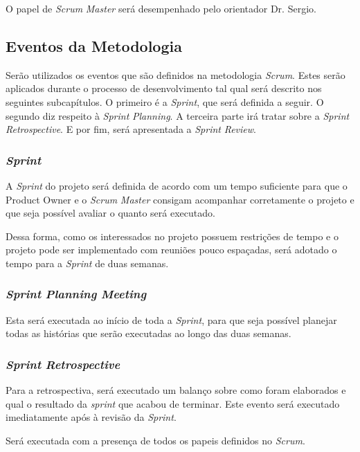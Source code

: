 O papel de \textit{Scrum} \textit{Master} será desempenhado pelo orientador Dr. Sergio. 

\subsection{Eventos da Metodologia}
\label{subsec:eventosdametodologia}
Serão utilizados os eventos que são definidos na metodologia \textit{Scrum}. Estes serão aplicados
durante o processo de desenvolvimento tal qual será descrito nos seguintes subcapítulos.
O primeiro é a \textit{Sprint}, que será definida a seguir.
O segundo diz respeito à \textit{Sprint} \textit{Planning}. A terceira parte irá tratar sobre a \textit{Sprint} \textit{Retrospective}.
E por fim, será apresentada a \textit{Sprint} \textit{Review}.

\subsubsection{\textit{Sprint}}
\label{subsec:sprint}
A \textit{Sprint} do projeto será definida de acordo com um tempo suficiente para que o Product Owner e o 
\textit{Scrum} \textit{Master} consigam acompanhar corretamente o projeto e que seja possível avaliar o quanto
será executado.

Dessa forma, como os interessados no projeto possuem restrições de tempo e o projeto pode
ser implementado com reuniões pouco espaçadas, será adotado o tempo para a \textit{Sprint} de duas
semanas.


\subsubsection{\textit{Sprint} \textit{Planning} \textit{Meeting}}
\label{subsec:sprintplanningmeeting}
Esta será executada ao início de toda a \textit{Sprint}, para que seja possível planejar
todas as histórias que serão executadas ao longo das duas semanas. 

\subsubsection{\textit{Sprint} \textit{Retrospective}}
\label{subsec:sprintplanningmeeting}
Para a retrospectiva, será executado um balanço sobre como foram elaborados e qual o resultado
da \textit{sprint} que acabou de terminar. Este evento será executado imediatamente após à
revisão da \textit{Sprint}. 

Será executada com a presença de todos os papeis definidos no \textit{Scrum}.


